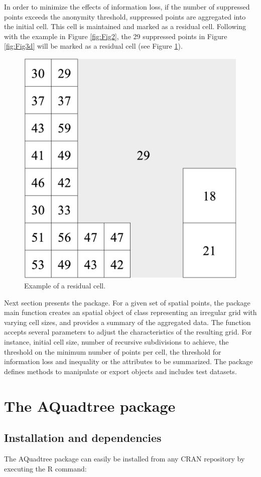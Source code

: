 In order to minimize the effects of information loss, if the number of suppressed points exceeds the anonymity threshold, suppressed points are aggregated into the initial cell. This cell is maintained and marked as a residual cell. Following with the example in Figure \ref{fig:Fig2}, the 29 suppressed points in Figure \ref{fig:Fig3d} will be marked as a residual cell (see Figure \ref{fig:Fig5}).

\begin{figure}[ht!]
\centering
\includegraphics[width=0.25\linewidth]{images/Fig5.png}
\caption{\label{fig:Fig5} Example of a residual cell.}
\end{figure}

Next section presents the  package. For a given set of spatial points, the package main function creates an  spatial object of class  representing an irregular grid with varying cell sizes, and provides a summary of the aggregated data. The function accepts several parameters to adjust the characteristics of the resulting grid. For instance, initial cell size, number of recursive subdivisions to achieve, the threshold on the minimum number of points per cell, the threshold for information loss and inequality or the attributes to be summarized. The package defines methods to manipulate or export  objects and includes test datasets.


\section{The AQuadtree package} \label{sec:pkg}

\subsection{Installation and dependencies} \label{sec:inst}

The AQuadtree package can easily be installed from any CRAN repository by executing the R command:

